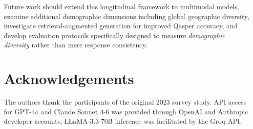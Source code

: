 \documentclass[11pt,a4paper]{article}
\begin{document}
Future work should extend this longitudinal framework to multimodal models,
examine additional demographic dimensions including global geographic diversity,
investigate retrieval-augmented generation for improved Qasper accuracy, and
develop evaluation protocols specifically designed to measure \emph{demographic
diversity} rather than mere response consistency.

\section*{Acknowledgements}

The authors thank the participants of the original 2023 survey study. API access
for GPT-4o and Claude Sonnet 4-6 was provided through OpenAI and Anthropic
developer accounts; LLaMA-3.3-70B inference was facilitated by the Groq API.


\end{document}
